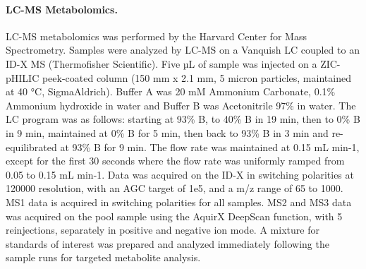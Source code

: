 \paragraph{LC-MS Metabolomics.}
LC-MS metabolomics was performed by the Harvard Center for Mass Spectrometry. Samples were analyzed by LC-MS on a Vanquish LC coupled to an ID-X MS (Thermofisher Scientific). Five µL of sample was injected on a ZIC-pHILIC peek-coated column (150 mm x 2.1 mm, 5 micron particles, maintained at 40 °C, SigmaAldrich). Buffer A was 20 mM Ammonium Carbonate, 0.1\% Ammonium hydroxide in water and Buffer B was Acetonitrile 97\% in water. The LC program was as follows: starting at 93\% B, to 40\% B in 19 min, then to 0\% B in 9 min, maintained at 0\% B for 5 min, then back to 93\% B in 3 min and re-equilibrated at 93\% B for 9 min. The flow rate was maintained at 0.15 mL min-1, except for the first 30 seconds where the flow rate was uniformly ramped from 0.05 to 0.15 mL min-1. Data was acquired on the ID-X in switching polarities at 120000 resolution, with an AGC target of 1e5, and a m/z range of 65 to 1000. MS1 data is acquired in switching polarities for all samples. MS2 and MS3 data was acquired on the pool sample using the AquirX DeepScan function, with 5 reinjections, separately in positive and negative ion mode. A mixture for standards of interest was prepared and analyzed immediately following the sample runs for targeted metabolite analysis.

